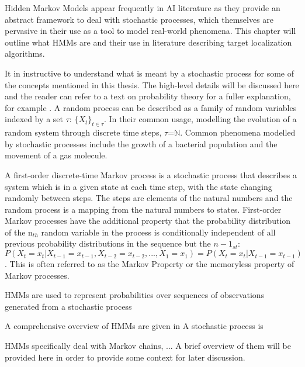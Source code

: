 \placeholder{}
Hidden Markov Models appear frequently in AI literature as they provide an abstract framework to deal with stochastic processes, which themselves are pervasive in their use as a tool to model real-world phenomena. This chapter will outline what HMMs are and their use in literature describing target localization algorithms.

It in instructive to understand what is meant by a stochastic process for some of the concepts mentioned in this thesis. The high-level details will be discussed here and the reader can refer to a text on probability theory for a fuller explanation, for example \cite{papoulis02}. A random process can be described as a family of random variables indexed by a set $\tau$: $\{X_t\}_{t\in\tau}$. In their common usage, modelling the evolution of a random system through discrete time steps, $\tau$=$\mathbb N$. Common phenomena modelled by stochastic processes include the growth of a bacterial population and the movement of a gas molecule.\par

A first-order discrete-time Markov process is a stochastic process that describes a system which is in a given state at each time step, with the state changing randomly between steps. The steps are elements of the natural numbers and the random process is a mapping from the natural numbers to states. First-order Markov processes have the additional property that the probability distribution of the n$_{th}$ random variable in the process is conditionally independent of all previous probability distributions in the sequence but the $n-1_{st}$: $P(X_t = x_t | X_{t-1} = x_{t-1}, X_{t-2} = x_{t-2}, ... , X_{1} = x_{1}) = P(X_t = x_t | X_{t-1} = x_{t-1})$. This is often referred to as the Markov Property or the memoryless property of Markov processes. 

HMMs are used to represent probabilities over sequences of observations generated from a stochastic process \cite{Ghahramani2001ANNETWORKS}


A comprehensive overview of HMMs are given in \cite{Ghahramani2001ANNETWORKS} A stochastic process is 

HMMs specifically deal with Markov chains, ... A brief overview of them will be provided here in order to provide some context for later discussion.\par